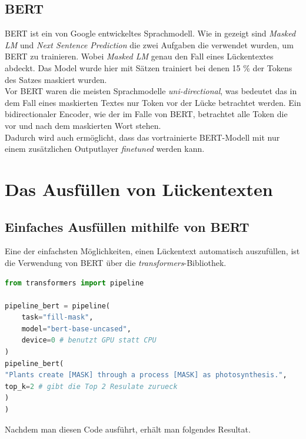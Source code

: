 \documentclass[a4paper, 11pt]{article}          %
\begin{document}
\subsection{BERT}
BERT ist ein von Google entwickeltes Sprachmodell. 
Wie in \cite{turc2019} gezeigt sind \textit{Masked LM} und \textit{Next Sentence Prediction} die zwei Aufgaben die verwendet wurden, um BERT zu trainieren.
Wobei \textit{Masked LM} genau den Fall eines Lückentextes abdeckt.
Das Model wurde hier mit Sätzen trainiert bei denen 15 \% der Tokens des Satzes maskiert wurden.
\\
Vor BERT waren die meisten Sprachmodelle \textit{uni-directional}, was bedeutet das in dem Fall eines maskierten Textes nur Token vor der Lücke betrachtet werden.
Ein bidirectionaler Encoder, wie der im Falle von BERT, betrachtet alle Token die vor und nach dem maskierten Wort stehen. \cite{IBM_MLM}
\\
Dadurch wird auch ermöglicht, dass das vortrainierte BERT-Modell mit nur einem zusätzlichen Outputlayer \textit{finetuned} werden kann.

\newpage
\section{Das Ausfüllen von Lückentexten}
\subsection{Einfaches Ausfüllen mithilfe von BERT}
Eine der einfachsten Möglichkeiten, einen Lückentext automatisch auszufüllen, ist die Verwendung von BERT über die \textit{transformers}-Bibliothek.\cite{transformersLib}
\begin{lstlisting}[language = python]
from transformers import pipeline

pipeline_bert = pipeline(
    task="fill-mask",
    model="bert-base-uncased",
    device=0 # benutzt GPU statt CPU
)
pipeline_bert(
"Plants create [MASK] through a process [MASK] as photosynthesis.",
top_k=2 # gibt die Top 2 Resulate zurueck
)
)
\end{lstlisting}

\medskip
Nachdem man diesen Code ausführt, erhält man folgendes Resultat.
\medskip \\
\end{document}
